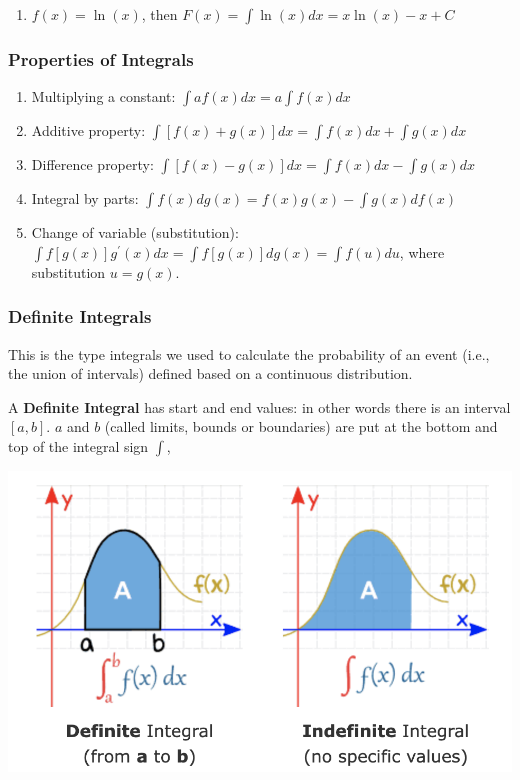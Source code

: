 \documentclass[
]{book}
\providecommand{\tightlist}{%
  \setlength{\itemsep}{0pt}\setlength{\parskip}{0pt}}
\begin{document}
\begin{enumerate}
\def\labelenumi{\arabic{enumi}.}
\setcounter{enumi}{4}
\tightlist
\item
  \(f(x) = \ln(x)\), then \(F(x) = \int \ln(x) dx = x\ln(x) - x + C\)
\end{enumerate}

\hfill\break

\hypertarget{properties-of-integrals-1}{%
\subsubsection{Properties of Integrals}\label{properties-of-integrals-1}}

\begin{enumerate}
\def\labelenumi{\arabic{enumi}.}
\item
  Multiplying a constant: \(\int af(x)dx = a\int f(x)dx\)
\item
  Additive property: \(\int [f(x) + g(x)]dx = \int f(x)dx + \int g(x)dx\)
\item
  Difference property: \(\int [f(x) - g(x)]dx = \int f(x)dx - \int g(x)dx\)
\item
  Integral by parts: \(\int f(x)dg(x) = f(x)g(x) - \int g(x)df(x)\)
\item
  Change of variable (substitution): \(\int f[g(x)] g^\prime(x)dx = \int f[g(x)] dg(x) = \int f(u)du\), where substitution \(u = g(x)\).
\end{enumerate}

\hfill\break

\hypertarget{definite-integrals-1}{%
\subsubsection{Definite Integrals}\label{definite-integrals-1}}

This is the type integrals we used to calculate the probability of an event (i.e., the union of intervals) defined based on a continuous distribution.

A \textbf{Definite Integral} has start and end values: in other words there is an interval \([a, b]\). \(a\) and \(b\) (called limits, bounds or boundaries) are put at the bottom and top of the integral sign \(\int\),

\begin{center}\includegraphics[width=0.5\linewidth]{topic03/Definite-Indefite} \end{center}
\end{document}
